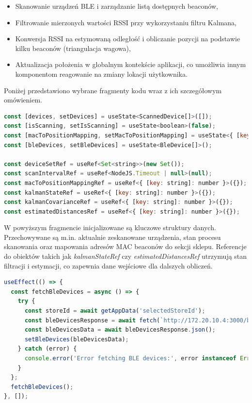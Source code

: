 \begin{itemize}
    \item Skanowanie urządzeń BLE i zarządzanie listą dostępnych beaconów,
    \item Filtrowanie mierzonych wartości RSSI przy wykorzystaniu filtru Kalmana,
    \item Konwersja RSSI na estymowaną odległość i obliczanie pozycji na podstawie kilku beaconów (triangulacja wagowa),
    \item Aktualizacja położenia w globalnym kontekście aplikacji, co umożliwia innym komponentom reagowanie na zmiany lokacji użytkownika.
\end{itemize}

Poniżej przedstawiono wybrane fragmenty kodu wraz z ich szczegółowym omówieniem.

\begin{lstlisting}[language=JavaScript, caption={Inicjalizacja stanu i referencji do wewnętrznych struktur danych}, label={lst:useBluetooth_init}]
const [devices, setDevices] = useState<ScannedDevice[]>([]);
const [isScanning, setIsScanning] = useState<boolean>(false);
const [macToPositionMapping, setMacToPositionMapping] = useState<{ [key: string]: number }>({});
const [bleDevices, setBleDevices] = useState<BleDevice[]>();

const deviceSetRef = useRef<Set<string>>(new Set());
const scanIntervalRef = useRef<NodeJS.Timeout | null>(null);
const macToPositionMappingRef = useRef<{ [key: string]: number }>({});
const kalmanStateRef = useRef<{ [key: string]: number }>({});
const kalmanCovarianceRef = useRef<{ [key: string]: number }>({});
const estimatedDistancesRef = useRef<{ [key: string]: number }>({});
\end{lstlisting}

W powyższym fragmencie inicjalizowane są kluczowe struktury danych. Przechowywane są m.in. aktualnie zeskanowane urządzenia, stan procesu skanowania oraz mapowania adresów MAC beaconów do sekcji sklepu. Referencje do obiektów takich jak \textit{kalmanStateRef} czy \textit{estimatedDistancesRef} utrzymują stan filtracji i estymacji, co zapewnia dane wejściowe dla dalszych obliczeń.

\begin{lstlisting}[language=JavaScript, caption={Pobieranie mapowania urządzeń BLE do sekcji sklepu}, label={lst:useBluetooth_fetch}]
useEffect(() => {
  const fetchBleDevices = async () => {
    try {
      const storeId = await getAppData('selectedStoreId');
      const bleDevicesResponse = await fetch(`http://172.20.10.4:3000/ble_devices/${storeId}`);
      const bleDevicesData = await bleDevicesResponse.json();
      setBleDevices(bleDevicesData);
    } catch (error) {
      console.error('Error fetching BLE devices:', error instanceof Error ? error.message : 'Unknown error');
    }
  };
  fetchBleDevices();
}, []);
\end{lstlisting}

